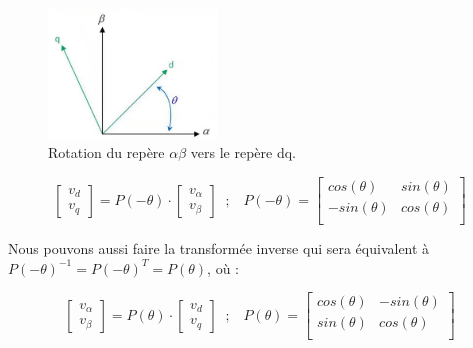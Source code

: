 \begin{figure}[!h]
    \centering
    \includegraphics[width=0.4\textwidth]{book_imgs/dq_alphabeta.png} 
    \caption{Rotation du repère $\alpha\beta$ vers le repère dq.}
    \label{img-dq_alphabeta}
\end{figure}

\begin{equation}
    \begin{bmatrix}
        v_d \\
        v_q
    \end{bmatrix} = 
        P(-\theta) \cdot
    \begin{bmatrix}
        v_\alpha \\
        v_\beta 
    \end{bmatrix} \;\; ; \;\;\;
    P(-\theta) =
     \begin{bmatrix}
        cos(\theta) & sin(\theta)  \\
        -sin(\theta) & cos(\theta)  \\
    \end{bmatrix}
    \label{eq:dq_alphabeta}
\end{equation}

Nous pouvons aussi faire la transformée inverse qui sera équivalent à $P(-\theta)^{-1} = P(-\theta)^T = P(\theta)$, où :

\begin{equation}
    \begin{bmatrix}
        v_\alpha \\
        v_\beta 
    \end{bmatrix} = 
        P(\theta) \cdot
    \begin{bmatrix}
        v_d \\
        v_q 
    \end{bmatrix} \;\; ; \;\;\;
    P(\theta) =
     \begin{bmatrix}
        cos(\theta) & -sin(\theta)  \\
        sin(\theta) & cos(\theta)  \\
    \end{bmatrix}
    \label{eq:alphabeta_dq}
\end{equation}

